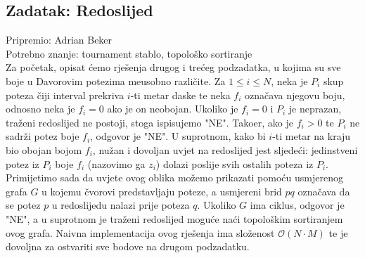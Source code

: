 \subsection*{Zadatak: Redoslijed}
\textsf{Pripremio: Adrian Beker}\\
\textsf{Potrebno znanje: tournament stablo, topološko sortiranje}\\

Za početak, opisat ćemo rješenja drugog i trećeg podzadatka, u kojima su sve boje u Davorovim potezima me\dj usobno razli\v{c}ite. Za $1 \leq i \leq N$, neka je $P_i$ skup poteza čiji interval prekriva $i$-ti metar daske te neka $f_i$ označava njegovu boju, odnosno neka je $f_i = 0$ ako je on neobojan. Ukoliko je $f_i = 0$ i $P_i$ je neprazan, traženi redoslijed ne postoji, stoga ispisujemo "NE". Tako\dj er, ako je $f_i > 0$ te $P_i$ ne sadrži potez boje $f_i$, odgovor je "NE". U suprotnom, kako bi $i$-ti metar na kraju bio obojan bojom $f_i$, nužan i dovoljan uvjet na redoslijed jest sljedeći: jedinstveni potez iz $P_i$ boje $f_i$ (nazovimo ga $z_i$) dolazi poslije svih ostalih poteza iz $P_i$. Primijetimo sada da uvjete ovog oblika možemo prikazati pomoću usmjerenog grafa $G$ u kojemu čvorovi predstavljaju poteze, a usmjereni brid $pq$ označava da se potez $p$ u redoslijedu nalazi prije poteza $q$. Ukoliko $G$ ima ciklus, odgovor je "NE", a u suprotnom je traženi redoslijed moguće naći topološkim sortiranjem ovog grafa. Naivna implementacija ovog rješenja ima složenost $\mathcal{O}(N \cdot M)$ te je dovoljna za ostvariti sve bodove na drugom podzadatku.

